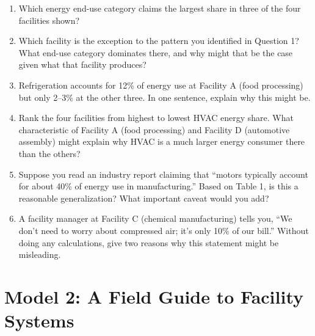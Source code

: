 \documentclass[./main.tex]{subfiles}
\begin{document}
\begin{enumerate}
  \item Which energy end-use category claims the largest share in three of the
        four facilities shown?
        \vspace{1.25in}

  \item Which facility is the exception to the pattern you identified in
        Question 1? What end-use category dominates there, and why might that
        be the case given what that facility produces?
        \vspace{1.25in}

  \item Refrigeration accounts for 12\% of energy use at Facility A (food
        processing) but only 2--3\% at the other three. In one sentence,
        explain why this might be.
        \vspace{1.25in}

  \item Rank the four facilities from highest to lowest HVAC energy share.
        What characteristic of Facility A (food processing) and Facility D
        (automotive assembly) might explain why HVAC is a much larger energy
        consumer there than the others?
        \vspace{1.25in}

  \item Suppose you read an industry report claiming that ``motors typically
        account for about 40\% of energy use in manufacturing.'' Based on
        Table 1, is this a reasonable generalization? What important caveat
        would you add?
        \vspace{1.25in}

  \item A facility manager at Facility C (chemical manufacturing) tells you,
        ``We don't need to worry about compressed air; it's only 10\% of our
        bill.'' Without doing any calculations, give two reasons why this
        statement might be misleading.
        \vspace{1.25in}
\end{enumerate}

\clearpage
\section*{Model 2: A Field Guide to Facility Systems}
\end{document}
